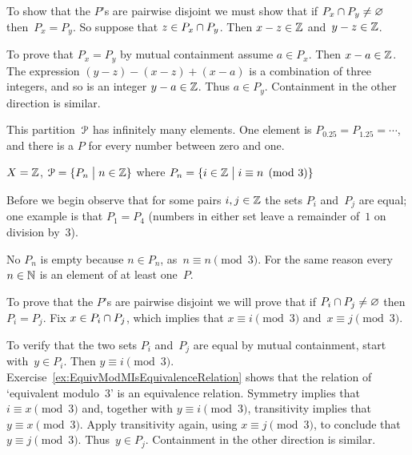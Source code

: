 \documentclass{test}  %
\begin{document}
\begin{problem}
\begin{exes}
\begin{answer}
  To show that the $P$'s are pairwise disjoint 
  we must show that
  if $P_x\cap P_y\neq\varnothing$ then~$P_x=P_y$.
  So suppose that $z\in P_x\cap P_y$.
  Then $x-z\in\mathbb{Z}$ and~$y-z\in \mathbb{Z}$.
  
  To prove that $P_x=P_y$ by mutual containment assume $a\in P_x$.
  Then $x-a\in\mathbb{Z}$.
  The expression $(y-z)-(x-z)+(x-a)$ is a combination of three integers,
  and so is an integer $y-a\in\mathbb{Z}$.
  Thus $a\in P_y$.
  Containment in the other direction is similar.

  This partition~$\EuScript{P}$ has infinitely many elements.
  One element is $P_{0.25}=P_{1.25}=\cdots$, and there is a $P$ for every
  number between zero and one.  
\end{answer}
\begin{exercise} 
     $X=\mathbb{Z}$, $\EuScript{P}=\{P_n \bigm| n\in\mathbb{Z}\}$
      where $P_n=\{i\in\mathbb{Z} \bigm| i\equiv n\pmod 3\}$
\end{exercise}
\begin{answer}
  Before we begin observe that 
  for some pairs $i,j\in\mathbb{Z}$ the sets $P_i$ and~$P_j$ are equal;
  one example is that $P_1=P_4$ (numbers in either set leave a remainder 
  of~$1$ on division by~$3$).

  No $P_n$ is empty because $n\in P_n$, as~$n\equiv n\pmod 3$.
  For the same reason every~$n\in\mathbb{N}$ is an element of at least
  one~$P$.

  To prove that the $P$'s are pairwise disjoint
  we will prove that if 
  $P_i\cap P_j\neq \varnothing$ then $P_i=P_j$.
  Fix $x\in P_i\cap P_j$, which implies that
  $x\equiv i\pmod 3$ and~$x\equiv j\pmod 3$.

  To verify that the two sets $P_i$ and~$P_j$ are equal by mutual
  containment, start with~$y\in P_i$.
  Then $y\equiv i\pmod 3$.
  Exercise~\ref{ex:EquivModMIsEquivalenceRelation}
  shows that the relation of `equivalent modulo~$3$' is an 
  equivalence relation.
  Symmetry implies that $i\equiv x\pmod 3$ and, 
  together with $y\equiv i\pmod 3$,
  transitivity implies that $y\equiv x\pmod 3$.
  Apply transitivity again, using $x\equiv j\pmod 3$, to conclude that
  $y\equiv j\pmod 3$. 
  Thus~$y\in P_j$.
  Containment in the other direction is similar.  


\end{answer}
\end{exes}
\end{problem}
\end{document}
